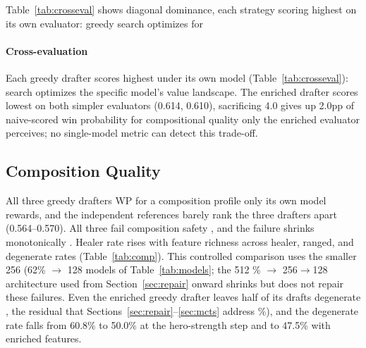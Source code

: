 \documentclass[journal]{IEEEtran}
\providecommand{\DIFaddtex}[1]{{\protect\color{blue} \sf #1}} %
\providecommand{\DIFdeltex}[1]{{\protect\color{red} \scriptsize #1}} %
\providecommand{\DIFaddbegin}{} %
\providecommand{\DIFaddend}{} %
\providecommand{\DIFdelbegin}{} %
\providecommand{\DIFdelend}{} %
\providecommand{\DIFadd}[1]{\texorpdfstring{\DIFaddtex{#1}}{#1}} %
\providecommand{\DIFdel}[1]{\texorpdfstring{\DIFdeltex{#1}}{}} %
\begin{document}
\DIFdelbegin \DIFdel{Table~\ref{tab:crosseval} shows diagonal dominance, each strategy scoring highest on its own evaluator: greedy search optimizes for }\DIFdelend \DIFaddbegin \paragraph{\DIFadd{Cross-evaluation}} \DIFadd{Each greedy drafter scores highest under its own model (Table~\ref{tab:crosseval}): search optimizes }\DIFaddend the specific model's value landscape. The enriched drafter \DIFdelbegin \DIFdel{scores lowest on both simpler evaluators (0.614, 0.610), sacrificing 4.0}\DIFdelend \DIFaddbegin \DIFadd{gives up 2.0}\DIFaddend pp of naive-scored \DIFdelbegin \DIFdel{win probability for compositional quality only the enriched evaluator perceives; no single-model metric can detect this trade-off. }%

\subsection{\DIFdel{Composition Quality}}
\addtocounter{subsection}{-1}%

\DIFdel{All three greedy drafters }\DIFdelend \DIFaddbegin \DIFadd{WP for a composition profile only its own model rewards, and the independent references barely rank the three drafters apart (0.564--0.570). All three }\DIFaddend fail composition safety\DIFdelbegin \DIFdel{, and the failure shrinks monotonically }\DIFdelend \DIFaddbegin \DIFadd{. Healer rate rises }\DIFaddend with feature richness \DIFdelbegin \DIFdel{across healer, ranged, and degenerate rates (Table~\ref{tab:comp}). This controlled comparison uses the smaller 256}\DIFdelend \DIFaddbegin \DIFadd{(62\% }\DIFaddend $\to$ \DIFdelbegin \DIFdel{128 models of Table~\ref{tab:models}; the 512}\DIFdelend \DIFaddbegin \DIFadd{76\% }\DIFaddend $\to$ \DIFdelbegin \DIFdel{256$\to$128 architecture used from Section~\ref{sec:repair} onward shrinks but does not repair these failures. Even the enriched greedy drafter leaves half of its drafts degenerate , the residual that Sections~\ref{sec:repair}--\ref{sec:mcts} address}\DIFdelend \DIFaddbegin \DIFadd{80\%), and the degenerate rate falls from 60.8\% to 50.0\% at the hero-strength step and to 47.5\% with enriched features}\DIFaddend .
\end{document}
